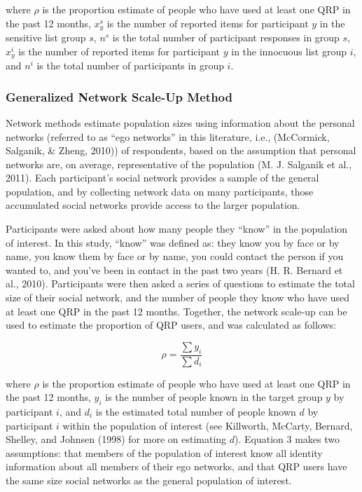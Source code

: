 \documentclass[jou]{apa6}
\theoremstyle{definition}
\theoremstyle{definition}
\theoremstyle{definition}
\theoremstyle{remark}
\begin{document}
where \(\rho\) is the proportion estimate of people who have used at
least one QRP in the past 12 months, \(x_y^s\) is the number of reported
items for participant \(y\) in the sensitive list group \(s\), \(n^s\)
is the total number of participant responses in group \(s\), \(x_y^i\)
is the number of reported items for participant \(y\) in the innocuous
list group \(i\), and \(n^i\) is the total number of participants in
group \(i\).

\subsubsection{Generalized Network Scale-Up
Method}\label{generalized-network-scale-up-method}

Network methods estimate population sizes using information about the
personal networks (referred to as \enquote{ego networks} in this
literature, i.e., (McCormick, Salganik, \& Zheng, 2010)) of respondents,
based on the assumption that personal networks are, on average,
representative of the population (M. J. Salganik et al., 2011). Each
participant's social network provides a sample of the general
population, and by collecting network data on many participants, those
accumulated social networks provide access to the larger population.

Participants were asked about how many people they \enquote{know} in the
population of interest. In this study, \enquote{know} was defined as:
they know you by face or by name, you know them by face or by name, you
could contact the person if you wanted to, and you've been in contact in
the past two years (H. R. Bernard et al., 2010). Participants were then
asked a series of questions to estimate the total size of their social
network, and the number of people they know who have used at least one
QRP in the past 12 months. Together, the network scale-up can be used to
estimate the proportion of QRP users, and was calculated as follows:

\begin{equation}
\rho = \frac{\sum y_i}{\sum d_i}
\end{equation}

where \(\rho\) is the proportion estimate of people who have used at
least one QRP in the past 12 months, \(y_i\) is the number of people
known in the target group \(y\) by participant \(i\), and \(d_i\) is the
estimated total number of people known \(d\) by participant \(i\) within
the population of interest (see Killworth, McCarty, Bernard, Shelley,
and Johnsen (1998) for more on estimating \(d\)). Equation 3 makes two
assumptions: that members of the population of interest know all
identity information about all members of their ego networks, and that
QRP users have the same size social networks as the general population
of interest.
\end{document}

